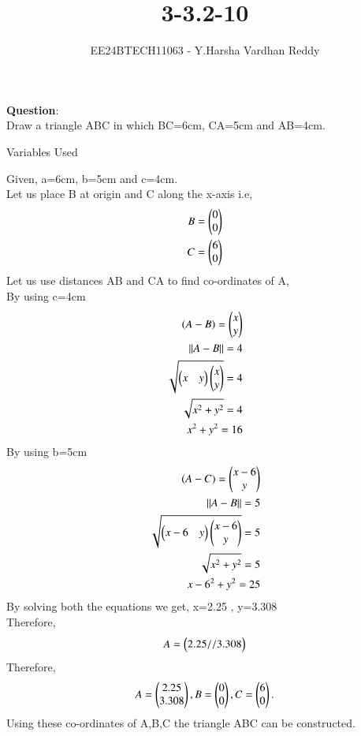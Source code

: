 \documentclass[journal]{IEEEtran}
\begin{document}

\vspace{3cm}

\title{3-3.2-10}
\author{EE24BTECH11063 - Y.Harsha Vardhan Reddy
}
{\let\newpage\relax\maketitle}

\renewcommand{\thefigure}{\theenumi}
\renewcommand{\thetable}{\theenumi}
\setlength{\intextsep}{10pt} %


\renewcommand{\thetable}{\theenumi}
\textbf{Question}:\\
Draw a triangle ABC in which BC=6cm, CA=5cm and AB=4cm.
\\
\solution
\begin{table}[h!]    
  \centering
  
  \caption{Variables Used}
  \label{tab1-1.2-20}
\end{table}
Given, a=6cm, b=5cm and c=4cm.\\
Let us place B at origin and C along the x-axis i.e, 
\begin{align}
B = \begin{pmatrix}0\\0\end{pmatrix} \\
C = \begin{pmatrix}6\\0\end{pmatrix}
\end{align}
Let us use distances AB and CA to find co-ordinates of A,\\
By using c=4cm
\begin{align}
    (A-B)=\begin{pmatrix}x\\y\end{pmatrix}\\
    \left\lVert A-B\right\rVert=4\\
    \sqrt{\begin{pmatrix}x & y\end{pmatrix} \begin{pmatrix}x \\ y\end{pmatrix}}=4\\
    \sqrt{x^2+y^2}=4\\
    x^2+y^2=16
\end{align}
By using b=5cm
\begin{align}
    (A-C)=\begin{pmatrix}x-6\\y\end{pmatrix}\\
    \left\lVert A-B\right\rVert=5\\
    \sqrt{\begin{pmatrix}x-6 & y\end{pmatrix} \begin{pmatrix}x-6 \\ y\end{pmatrix}}=5\\
    \sqrt{x^2+y^2}=5\\
    {x-6}^2+y^2=25
\end{align}
By solving both the equations we get, x=2.25 , y=3.308\\
Therefore,
\begin{align}
A=\begin{pmatrix}2.25//3.308\end{pmatrix}
\end{align}
Therefore,
\begin{align}
    A=\begin{pmatrix}2.25\\3.308\end{pmatrix},B=\begin{pmatrix}0\\0\end{pmatrix},C=\begin{pmatrix}6\\0\end{pmatrix} .
\end{align}
Using these co-ordinates of A,B,C the triangle ABC can be constructed.
\end{document}
